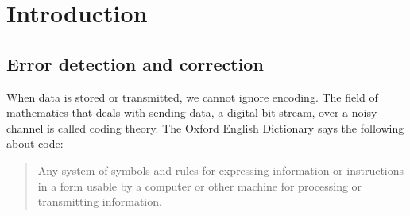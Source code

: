 \chapter{Introduction}

\section{Error detection and correction}

When data is stored or transmitted, we cannot ignore encoding. The field of mathematics that deals with sending data, a digital bit stream, over a noisy channel is called coding theory. The Oxford English Dictionary says the following about code:

\begin{quote}
    Any system of symbols and rules for expressing information or instructions in a form usable by a computer or other machine for processing or transmitting information.
\end{quote}
